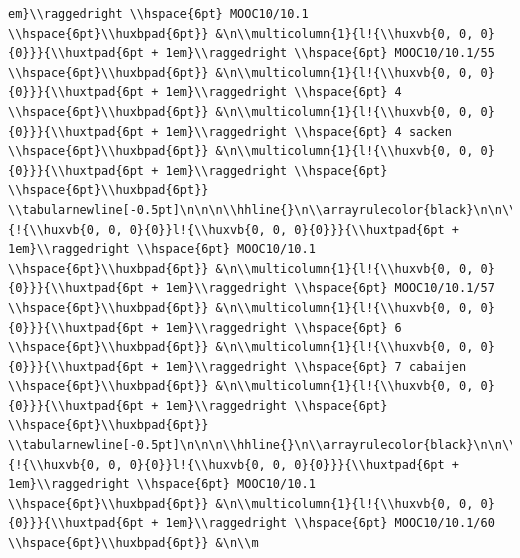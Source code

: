\documentclass[11pt,preprint, authoryear]{elsarticle}
\numberwithin{equation}{section}
\numberwithin{figure}{section}
\numberwithin{table}{section}
\begin{document}
\begin{verbatim}
em}\\raggedright \\hspace{6pt} MOOC10/10.1 \\hspace{6pt}\\huxbpad{6pt}} &\n\\multicolumn{1}{l!{\\huxvb{0, 0, 0}{0}}}{\\huxtpad{6pt + 1em}\\raggedright \\hspace{6pt} MOOC10/10.1/55 \\hspace{6pt}\\huxbpad{6pt}} &\n\\multicolumn{1}{l!{\\huxvb{0, 0, 0}{0}}}{\\huxtpad{6pt + 1em}\\raggedright \\hspace{6pt} 4 \\hspace{6pt}\\huxbpad{6pt}} &\n\\multicolumn{1}{l!{\\huxvb{0, 0, 0}{0}}}{\\huxtpad{6pt + 1em}\\raggedright \\hspace{6pt} 4 sacken \\hspace{6pt}\\huxbpad{6pt}} &\n\\multicolumn{1}{l!{\\huxvb{0, 0, 0}{0}}}{\\huxtpad{6pt + 1em}\\raggedright \\hspace{6pt}  \\hspace{6pt}\\huxbpad{6pt}} \\tabularnewline[-0.5pt]\n\n\n\\hhline{}\n\\arrayrulecolor{black}\n\n\\multicolumn{1}{!{\\huxvb{0, 0, 0}{0}}l!{\\huxvb{0, 0, 0}{0}}}{\\huxtpad{6pt + 1em}\\raggedright \\hspace{6pt} MOOC10/10.1 \\hspace{6pt}\\huxbpad{6pt}} &\n\\multicolumn{1}{l!{\\huxvb{0, 0, 0}{0}}}{\\huxtpad{6pt + 1em}\\raggedright \\hspace{6pt} MOOC10/10.1/57 \\hspace{6pt}\\huxbpad{6pt}} &\n\\multicolumn{1}{l!{\\huxvb{0, 0, 0}{0}}}{\\huxtpad{6pt + 1em}\\raggedright \\hspace{6pt} 6 \\hspace{6pt}\\huxbpad{6pt}} &\n\\multicolumn{1}{l!{\\huxvb{0, 0, 0}{0}}}{\\huxtpad{6pt + 1em}\\raggedright \\hspace{6pt} 7 cabaijen \\hspace{6pt}\\huxbpad{6pt}} &\n\\multicolumn{1}{l!{\\huxvb{0, 0, 0}{0}}}{\\huxtpad{6pt + 1em}\\raggedright \\hspace{6pt}  \\hspace{6pt}\\huxbpad{6pt}} \\tabularnewline[-0.5pt]\n\n\n\\hhline{}\n\\arrayrulecolor{black}\n\n\\multicolumn{1}{!{\\huxvb{0, 0, 0}{0}}l!{\\huxvb{0, 0, 0}{0}}}{\\huxtpad{6pt + 1em}\\raggedright \\hspace{6pt} MOOC10/10.1 \\hspace{6pt}\\huxbpad{6pt}} &\n\\multicolumn{1}{l!{\\huxvb{0, 0, 0}{0}}}{\\huxtpad{6pt + 1em}\\raggedright \\hspace{6pt} MOOC10/10.1/60 \\hspace{6pt}\\huxbpad{6pt}} &\n\\m
\end{verbatim}
\end{document}
